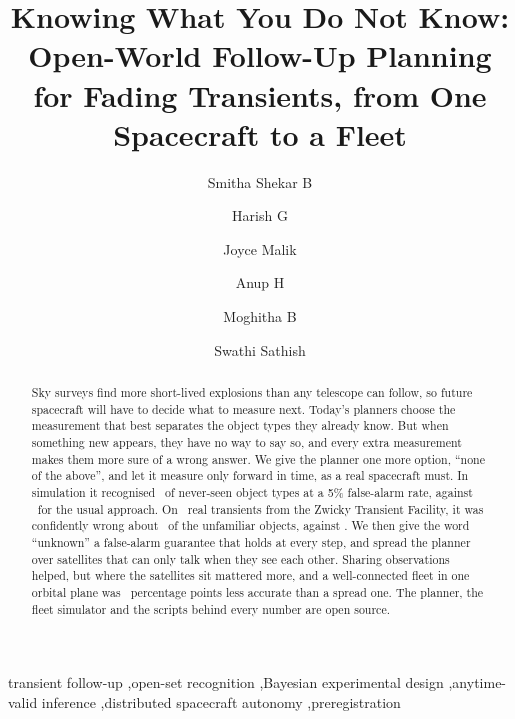 \documentclass[final,5p,times,twocolumn,authoryear]{elsarticle}
\begin{document}
\linenumbers

\begin{frontmatter}

\title{Knowing What You Do Not Know: Open-World Follow-Up Planning for Fading Transients, from One Spacecraft to a Fleet}

\author[aitp]{Smitha Shekar B}
\author[aitp]{Harish G}
\author[ait]{Joyce Malik}
\author[ait]{Anup H}
\author[ait]{Moghitha B}
\author[ait]{Swathi Sathish}


\begin{abstract}
Sky surveys find more short-lived explosions than any telescope can follow, so future spacecraft will have to decide what to measure next. Today's planners choose the measurement that best separates the object types they already know. But when something new appears, they have no way to say so, and every extra measurement makes them more sure of a wrong answer. We give the planner one more option, ``none of the above'', and let it measure only forward in time, as a real spacecraft must. In simulation it recognised \SimTprP\ of never-seen object types at a 5\% false-alarm rate, against \SimTprBthree\ for the usual approach. On \RealNEvents\ real transients from the Zwicky Transient Facility, it was confidently wrong about \RealCCwWhP\ of the unfamiliar objects, against \RealCCwWhBthree. We then give the word ``unknown'' a false-alarm guarantee that holds at every step, and spread the planner over satellites that can only talk when they see each other. Sharing observations helped, but where the satellites sit mattered more, and a well-connected fleet in one orbital plane was \FleetBFourMag\ percentage points less accurate than a spread one. The planner, the fleet simulator and the scripts behind every number are open source.
\end{abstract}

\begin{keyword}
transient follow-up \sep open-set recognition \sep Bayesian experimental design \sep anytime-valid inference \sep distributed spacecraft autonomy \sep preregistration
\end{keyword}

\end{frontmatter}
\end{document}
